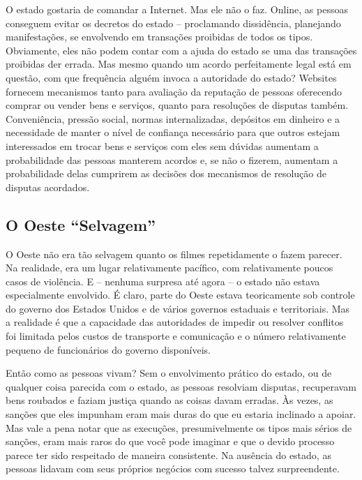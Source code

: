 O estado gostaria de comandar a Internet. Mas ele não o faz. Online, as pessoas conseguem evitar os decretos do estado -- proclamando dissidência, planejando manifestações, se envolvendo em transações proibidas de todos os tipos. Obviamente, eles não podem contar com a ajuda do estado se uma das transações proibidas der errada. Mas mesmo quando um acordo perfeitamente legal está em questão, com que frequência alguém invoca a autoridade do estado? Websites fornecem mecanismos tanto para avaliação da reputação de pessoas oferecendo comprar ou vender bens e serviços, quanto para resoluções de disputas também. Conveniência, pressão social, normas internalizadas, depósitos em dinheiro e a necessidade de manter o nível de confiança necessário para que outros estejam interessados em trocar bens e serviços com eles sem dúvidas aumentam a probabilidade das pessoas manterem acordos e, se não o fizerem, aumentam a probabilidade delas cumprirem as decisões dos mecanismos de resolução de disputas acordados.

\subsection*{O Oeste ``Selvagem'' }

O Oeste não era tão selvagem quanto os filmes repetidamente o fazem parecer. Na realidade, era um lugar relativamente pacífico, com relativamente poucos casos de violência. E -- nenhuma surpresa até agora -- o estado não estava especialmente envolvido. É claro, parte do Oeste estava teoricamente sob controle do governo dos Estados Unidos e de vários governos estaduais e territoriais. Mas a realidade é que a capacidade das autoridades de impedir ou resolver conflitos foi limitada pelos custos de transporte e comunicação e o número relativamente pequeno de funcionários do governo disponíveis.

Então como as pessoas vivam? Sem o envolvimento prático do estado, ou de qualquer coisa parecida com o estado, as pessoas resolviam disputas, recuperavam bens roubados e faziam justiça quando as coisas davam erradas. Às vezes, as sanções que eles impunham eram mais duras do que eu estaria inclinado a apoiar. Mas vale a pena notar que as execuções, presumivelmente os tipos mais sérios de sanções, eram mais raros do que você pode imaginar e que o devido processo parece ter sido respeitado de maneira consistente. Na ausência do estado, as pessoas lidavam com seus próprios negócios com sucesso talvez surpreendente.


